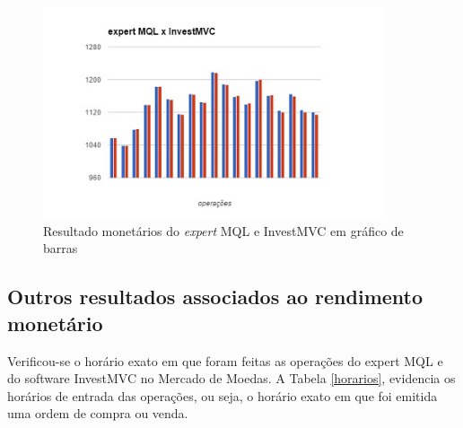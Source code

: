 \begin{figure}[H]
\centering
\includegraphics[width=0.9\textwidth]{figuras/graficoBarras}
\caption{Resultado monetários do \textit{expert} MQL e InvestMVC em gráfico de barras}
\label{graficoBarras}
\end{figure}

\subsection{Outros resultados associados ao rendimento monetário}

Verificou-se o horário exato em que foram feitas as operações do expert MQL e do software InvestMVC no Mercado de Moedas. A Tabela \ref{horarios}, evidencia os horários de entrada das operações, ou seja, o horário exato em que foi emitida uma ordem de compra ou venda.

